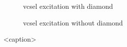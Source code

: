 	\begin{figure}[tp]
		\begin{subfigure}[t]{ 0.49\linewidth}
			\centering
			\caption{vcsel excitation with diamond}
			\label{subfig::vcsel_excitation_with_diamond}
		\end{subfigure}
		\hfill
		\begin{subfigure}[t]{ 0.49\linewidth}
			\centering
			\caption{vcsel excitation without diamond}
			\label{subfig::vcsel_excitation_without_diamond}
		\end{subfigure}
		\caption{<caption>}
	\end{figure}

